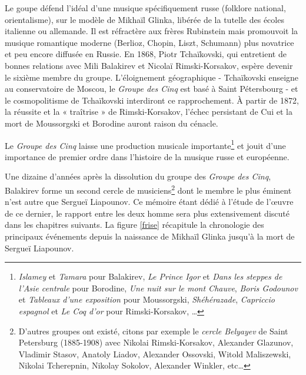 Le goupe défend l'idéal d'une musique spécifiquement russe (folklore national, orientalisme), sur le modèle de Mikhaïl Glinka, libérée de la tutelle des écoles italienne ou allemande. Il est réfractère aux frères Rubinstein mais promouvoit la musique romantique moderne (Berlioz, Chopin, Liszt, Schumann) plus novatrice et peu encore diffusée en Russie. En 1868, Piotr Tchaïkovski, qui entretient de bonnes relations avec Mili Balakirev et Nicolaï Rimski-Korsakov, espère devenir le sixième membre du groupe. L'éloignement géographique - Tchaïkovski enseigne au conservatoire de Moscou, le \emph{Groupe des Cinq} est basé à Saint Pétersbourg - et le cosmopolitisme de Tchaïkovski interdiront ce rapprochement. À partir de 1872, la réussite et la « traîtrise » de Rimski-Korsakov, l'échec persistant de Cui et la mort de Moussorgski et Borodine auront raison du cénacle.

Le \emph{Groupe des Cinq} laisse une production musicale importante\footnote{\emph{Islamey} et \emph{Tamara} pour Balakirev, \emph{Le Prince Igor} et \emph{Dans les steppes de l'Asie centrale} pour Borodine, \emph{Une nuit sur le mont Chauve}, \emph{Boris Godounov} et \emph{Tableaux d'une exposition} pour Moussorgski, \emph{Shéhérazade}, \emph{Capriccio espagnol} et \emph{Le Coq d'or} pour Rimski-Korsakov, \ldots} et jouit d'une importance de premier ordre dans l'histoire de la musique russe et européenne.

Une dizaine d'années après la dissolution du groupe des \emph{Groupe des Cinq}, Balakirev forme un second cercle de musiciens\footnote{D'autres groupes ont existé, citons par exemple le \emph{cercle Belyayev} de Saint Petersburg (1885-1908) avec Nikolai Rimski-Korsakov, Alexander Glazunov, Vladimir Stasov, Anatoly Liadov, Alexander Ossovski, Witold Maliszewski, Nikolai Tcherepnin, Nikolay Sokolov, Alexander Winkler, etc\ldots } dont le membre le plus éminent n'est autre que Sergueï Liapounov. Ce mémoire étant dédié à l'étude de l'œuvre de ce dernier, le rapport entre les deux homme sera plus extensivement discuté dans les chapitres suivants. La figure \ref{frise} récapitule la chronologie des principaux événements depuis la naissance de Mikhaïl Glinka jusqu'à la mort de Sergueï Liapounov.

